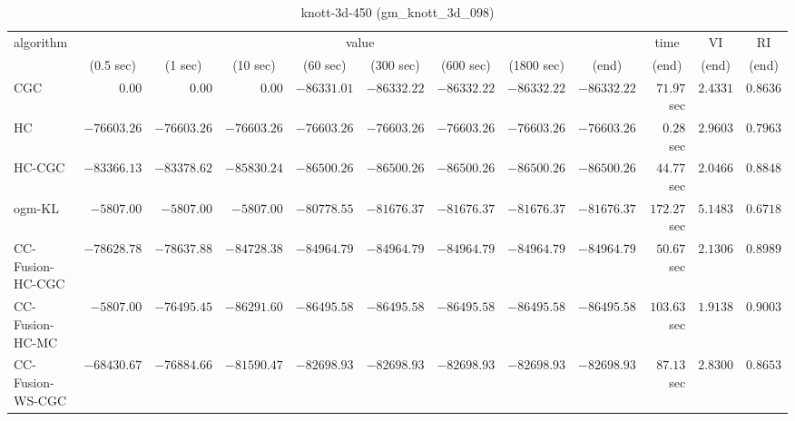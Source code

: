 \begin{table}[H]
\scriptsize
\centering
\caption{knott-3d-450 (gm\_knott\_3d\_098)}
\label{tab:anytimetable-knott-3d-450-gm-knott-3d-098}
\begin{tabular}{lrrrrrrrrrrr}
\toprule
           algorithm &                                   \multicolumn{8}{c}{value} & \multicolumn{1}{c}{time}    & \multicolumn{1}{c}{VI}  & \multicolumn{1}{c}{RI} \\  
\cmidrule(lr){2-9}\cmidrule(lr){10-10} \cmidrule(lr){11-11} \cmidrule(lr){12-12}   
                     & \multicolumn{1}{c}{(0.5 sec)} & \multicolumn{1}{c}{(1 sec)} & \multicolumn{1}{c}{(10 sec)} & \multicolumn{1}{c}{(60 sec)} & \multicolumn{1}{c}{(300 sec)} & \multicolumn{1}{c}{(600 sec)} & \multicolumn{1}{c}{(1800 sec)} & \multicolumn{1}{c}{(end)} & \multicolumn{1}{c}{(end)}    & \multicolumn{1}{c}{(end)}   & \multicolumn{1}{c}{(end)}  \\ \midrule 
                 CGC & $         0.00$ & $         0.00$ & $         0.00$ & $    -86331.01$ & $    -86332.22$ & $    -86332.22$ & $    -86332.22$ & $    -86332.22$ & $        71.97$ sec    & $       2.4331$  & $       0.8636$ \\ 
                  HC & $    -76603.26$ & $    -76603.26$ & $    -76603.26$ & $    -76603.26$ & $    -76603.26$ & $    -76603.26$ & $    -76603.26$ & $    -76603.26$ & $         0.28$ sec    & $       2.9603$  & $       0.7963$ \\ 
              HC-CGC & $    -83366.13$ & $    -83378.62$ & $    -85830.24$ & $    -86500.26$ & $    -86500.26$ & $    -86500.26$ & $    -86500.26$ & $    -86500.26$ & $        44.77$ sec    & $       2.0466$  & $       0.8848$ \\ 
              ogm-KL & $     -5807.00$ & $     -5807.00$ & $     -5807.00$ & $    -80778.55$ & $    -81676.37$ & $    -81676.37$ & $    -81676.37$ & $    -81676.37$ & $       172.27$ sec    & $       5.1483$  & $       0.6718$ \\ 
    CC-Fusion-HC-CGC & $    -78628.78$ & $    -78637.88$ & $    -84728.38$ & $    -84964.79$ & $    -84964.79$ & $    -84964.79$ & $    -84964.79$ & $    -84964.79$ & $        50.67$ sec    & $       2.1306$  & $       0.8989$ \\ 
     CC-Fusion-HC-MC & $     -5807.00$ & $    -76495.45$ & $    -86291.60$ & $    -86495.58$ & $    -86495.58$ & $    -86495.58$ & $    -86495.58$ & $    -86495.58$ & $       103.63$ sec    & $       1.9138$  & $       0.9003$ \\ 
    CC-Fusion-WS-CGC & $    -68430.67$ & $    -76884.66$ & $    -81590.47$ & $    -82698.93$ & $    -82698.93$ & $    -82698.93$ & $    -82698.93$ & $    -82698.93$ & $        87.13$ sec    & $       2.8300$  & $       0.8653$ \\ 

\end{tabular}
\end{table}
